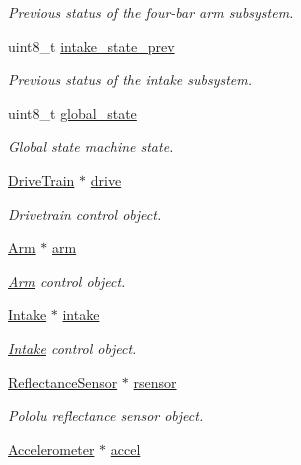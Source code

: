 \begin{DoxyCompactItemize}
\begin{DoxyCompactList}\small\item\em Previous status of the four-\/bar arm subsystem. \end{DoxyCompactList}\item 
uint8\+\_\+t \hyperlink{class_threaded_robot_a6ee4298a994be3756ea1821125ab9d57}{intake\+\_\+state\+\_\+prev}
\begin{DoxyCompactList}\small\item\em Previous status of the intake subsystem. \end{DoxyCompactList}\item 
uint8\+\_\+t \hyperlink{class_threaded_robot_a92782be4dc437d7e84b04d20a39a5de3}{global\+\_\+state}
\begin{DoxyCompactList}\small\item\em Global state machine state. \end{DoxyCompactList}\item 
\hyperlink{class_drive_train}{Drive\+Train} $\ast$ \hyperlink{class_threaded_robot_ad666af7d773c8096210f6b5c4d060086}{drive}
\begin{DoxyCompactList}\small\item\em Drivetrain control object. \end{DoxyCompactList}\item 
\hyperlink{class_arm}{Arm} $\ast$ \hyperlink{class_threaded_robot_afc4445eed32ecc9c375e17ccf4f37241}{arm}
\begin{DoxyCompactList}\small\item\em \hyperlink{class_arm}{Arm} control object. \end{DoxyCompactList}\item 
\hyperlink{class_intake}{Intake} $\ast$ \hyperlink{class_threaded_robot_ac4e32d1373e0d8a887c29378c002783f}{intake}
\begin{DoxyCompactList}\small\item\em \hyperlink{class_intake}{Intake} control object. \end{DoxyCompactList}\item 
\hyperlink{class_reflectance_sensor}{Reflectance\+Sensor} $\ast$ \hyperlink{class_threaded_robot_a6dcf388032425561c387f153ea141c79}{rsensor}
\begin{DoxyCompactList}\small\item\em Pololu reflectance sensor object. \end{DoxyCompactList}\item 
\hyperlink{class_accelerometer}{Accelerometer} $\ast$ \hyperlink{class_threaded_robot_ae12c29cb9719f6562f27402f487321e6}{accel}

\end{DoxyCompactItemize}
